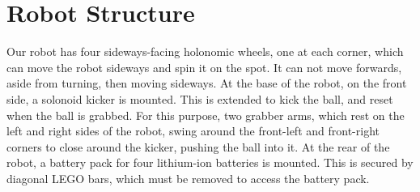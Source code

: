 \section{Robot Structure}

Our robot has four sideways-facing holonomic wheels, one at each corner, which
can move the robot sideways and spin it on the spot. It can not move forwards,
aside from turning, then moving sideways. At the base of the robot, on the
front side, a solonoid kicker is mounted. This is extended to kick the ball,
and reset when the ball is grabbed. For this purpose, two grabber arms, which
rest on the left and right sides of the robot, swing around the front-left and
front-right corners to close around the kicker, pushing the ball into it. At
the rear of the robot, a battery pack for four lithium-ion batteries is
mounted. This is secured by diagonal LEGO bars, which must be removed to access
the battery pack.

